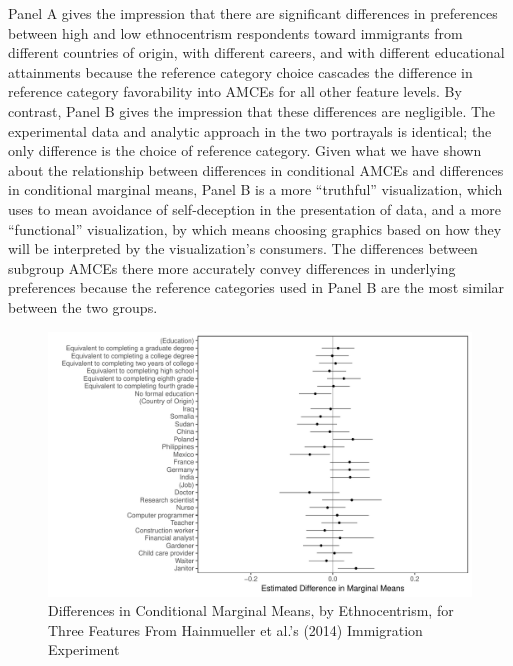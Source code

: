 \documentclass[a4paper,12pt]{article}\usepackage[]{graphicx}\usepackage[]{color}
\makeatletter
\def\maxwidth{ %
  \ifdim\Gin@nat@width>\linewidth
    \linewidth
  \else
    \Gin@nat@width
  \fi
}
\newenvironment{knitrout}{}{} %
\makeatother
\begin{document}
Panel A gives the impression that there are significant differences in preferences between high and low ethnocentrism respondents toward immigrants from different countries of origin, with different careers, and with different educational attainments because the reference category choice cascades the difference in reference category favorability into AMCEs for all other feature levels. By contrast, Panel B gives the impression that these differences are negligible. The experimental data and analytic approach in the two portrayals is identical; the only difference is the choice of reference category. Given what we have shown about the relationship between differences in conditional AMCEs and differences in conditional marginal means, Panel B is a more ``truthful'' visualization, which \citet{Cairo2016} uses to mean avoidance of self-deception in the presentation of data, and a more ``functional'' visualization, by which \citeauthor{Cairo2016} means choosing graphics based on how they will be interpreted by the visualization's consumers. The differences between subgroup AMCEs there more accurately convey differences in underlying preferences because the reference categories used in Panel B are the most similar between the two groups.

\begin{knitrout}
\color{fgcolor}\begin{figure}
\includegraphics[width=\maxwidth]{figure/hainmueller_mm_diffs-1} \caption[Differences in Conditional Marginal Means, by Ethnocentrism, for Three Features From Hainmueller et al.'s (2014) Immigration Experiment]{Differences in Conditional Marginal Means, by Ethnocentrism, for Three Features From Hainmueller et al.'s (2014) Immigration Experiment}\label{fig:hainmueller_mm_diffs}
\end{figure}


\end{knitrout}
\end{document}
